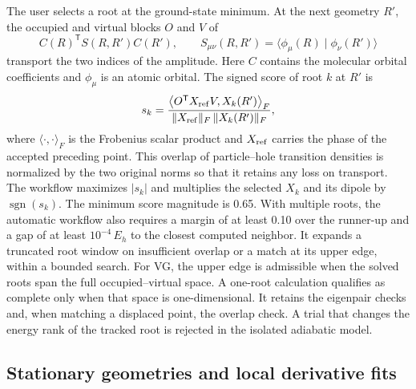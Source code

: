 The user selects a root at the ground-state minimum. At the next
geometry $R'$, the occupied and virtual blocks $O$ and $V$ of
\begin{equation}
 C(R)^{\mathsf T} S(R,R') C(R'), \qquad
 S_{\mu\nu}(R,R')=\langle\phi_\mu(R)\mid\phi_\nu(R')\rangle
\end{equation}
transport the two indices of the amplitude. Here $C$ contains the
molecular orbital coefficients and $\phi_\mu$ is an atomic orbital.
The signed score of root $k$ at $R'$ is
\begin{equation}
 s_k =
 \frac{\left\langle O^{\mathsf T}X_{\rm ref}V, X_k(R')\right\rangle_F}
 {\lVert X_{\rm ref}\rVert_F\,\lVert X_k(R')\rVert_F},
 \label{eq:electronic-tracking}
\end{equation}
where $\langle\cdot,\cdot\rangle_F$ is the Frobenius scalar product and
$X_{\rm ref}$ carries the phase of the accepted preceding point. This
overlap of particle--hole transition densities is normalized by the two
original norms so that it retains any loss on transport. The workflow
maximizes $|s_k|$ and multiplies the selected $X_k$ and its dipole by
$\operatorname{sgn}(s_k)$. The minimum score magnitude is 0.65. With
multiple roots, the automatic workflow also requires a margin of at
least 0.10 over the runner-up and a gap of at least $10^{-4}\,E_h$ to
the closest computed neighbor. It expands a truncated root window on
insufficient overlap or a match at its upper edge, within a bounded
search. For VG, the upper edge is admissible when the solved roots span
the full occupied--virtual space. A one-root calculation qualifies
as complete only when that space is one-dimensional. It retains the
eigenpair checks and, when matching a displaced point, the overlap check.
A trial that changes the energy rank of the tracked root is rejected in
the isolated adiabatic model.

\subsection{Stationary geometries and local derivative fits}
\label{sec:electronic-geometry}

